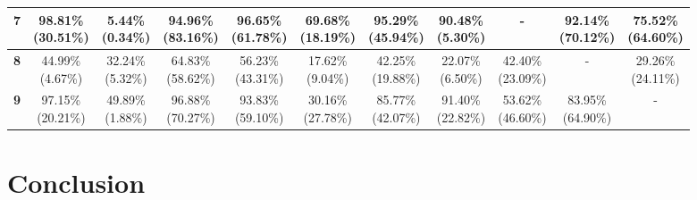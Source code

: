 \documentclass{report}
\begin{document}
\begin{center}
{\begin{tabular}{|c|c|c|c|c|c|c|c|c|c|c|}
  \textbf{7} & \makecell{98.81\% \\ (30.51\%)} & \makecell{5.44\% \\ (0.34\%)} & \makecell{94.96\% \\ (83.16\%)} & \makecell{96.65\% \\ (61.78\%)} & \makecell{69.68\% \\ (18.19\%)} & \makecell{95.29\% \\ (45.94\%)} & \makecell{90.48\% \\ (5.30\%)} & - & \makecell{92.14\% \\ (70.12\%)} & \makecell{75.52\% \\ (64.60\%)} \\ \hline

  \textbf{8} & \makecell{44.99\% \\ (4.67\%)} & \makecell{32.24\% \\ (5.32\%)} & \makecell{64.83\% \\ (58.62\%)} & \makecell{56.23\% \\ (43.31\%)} & \makecell{17.62\% \\ (9.04\%)} & \makecell{42.25\% \\ (19.88\%)} & \makecell{22.07\% \\ (6.50\%)} & \makecell{42.40\% \\ (23.09\%)} & - & \makecell{29.26\% \\ (24.11\%)} \\ \hline

  \textbf{9} & \makecell{97.15\% \\ (20.21\%)} & \makecell{49.89\% \\ (1.88\%)} & \makecell{96.88\% \\ (70.27\%)} & \makecell{93.83\% \\ (59.10\%)} & \makecell{30.16\% \\ (27.78\%)} & \makecell{85.77\% \\ (42.07\%)} & \makecell{91.40\% \\ (22.82\%)} & \makecell{53.62\% \\ (46.60\%)} & \makecell{83.95\% \\ (64.90\%)} & - \\ \hline
  \end{tabular}
}
\end{center}

\chapter{Conclusion}
\end{document}
